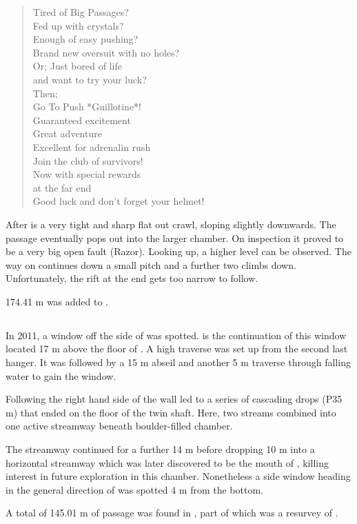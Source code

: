 \begin{verse}
Tired of Big Passages? \\
Fed up with crystals? \\
Enough of easy pushing? \\
Brand new oversuit with no holes? \\

Or; Just bored of life \\
   and want to try your luck? \\

Then; \\ 

Go To Push *Guillotine*! \\

Guaranteed excitement \\
Great adventure \\
Excellent for adrenalin rush \\

Join the club of survivors! \\

Now with special rewards \\
at the far end \\

Good luck and don't forget your helmet!
\end{verse}

After  is a very tight and sharp flat out crawl,
sloping slightly downwards. The passage eventually pops out into the
larger chamber. On inspection it proved to be a very big open fault
(Razor). Looking up, a higher level can be observed. The way on
continues down a small pitch and a further two climbs down.
Unfortunately, the rift at the end gets too narrow to follow.

174.41 m was added to .


\subsection{\texorpdfstring{}{Stagger Lee}}

In 2011, a window off the side of  was
spotted.  is the continuation of this window located
17 m above the floor of . A high traverse was set up from the
second last hanger. It was followed by a 15 m abseil and another 5 m
traverse through falling water to gain the window.

Following the right hand side of the wall led to a series of cascading
drops (P35 m) that ended on the floor of the twin shaft. Here, two
streams combined into one active streamway beneath boulder-filled
chamber.

The streamway continued for a further 14 m before dropping 10 m into a
horizontal streamway which was later discovered to be the mouth of
, killing interest in future exploration in this
chamber. Nonetheless a side window heading in the general direction of
 was spotted 4 m from the bottom.

A total of 145.01 m of passage was found in , part of
which was a resurvey of .
